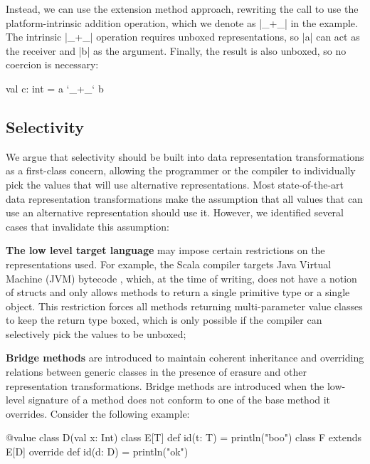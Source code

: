 Instead, we can use the extension method approach, rewriting the call to use the platform-intrinsic  addition operation, which we denote as |_+_| in the example. The intrinsic |_+_| operation requires unboxed representations, so |a| can act as the receiver and |b| as the argument. Finally, the result is also unboxed, so no coercion is necessary:

\begin{lstlisting-nobreak}
 val c: int = a `_+_` b
\end{lstlisting-nobreak}

\subsection{Selectivity}
\label{ldl:sec:problem-oo/selectivity}

We argue that selectivity should be built into data representation transformations as a first-class concern, allowing the programmer or the compiler to individually pick the values that will use alternative representations. Most state-of-the-art data representation transformations make the assumption that all values that can use an alternative representation should use it. However, we identified several cases that invalidate this assumption:

\textbf{The low level target language} may impose certain restrictions on the representations used. For example, the Scala compiler targets Java Virtual Machine (JVM) bytecode \cite{java-spec}, which, at the time of writing, does not have a notion of structs and only allows methods to return a single primitive type or a single object. This restriction forces all methods returning multi-parameter value classes to keep the return type boxed, which is only possible if the compiler can selectively pick the values to be unboxed;

\textbf{Bridge methods} \cite{cartwright-nextgen} are introduced to maintain coherent inheritance and overriding relations between generic classes in the presence of erasure and other representation transformations. Bridge methods are introduced when the low-level signature of a method does not conform to one of the base method it overrides. Consider the following example:

\begin{lstlisting-nobreak}
 @value class D(val x: Int)
 class E[T] {
   def id(t: T) = println("boo")
 }
 class F extends E[D] {
   override def id(d: D) = println("ok")
 }
\end{lstlisting-nobreak}

